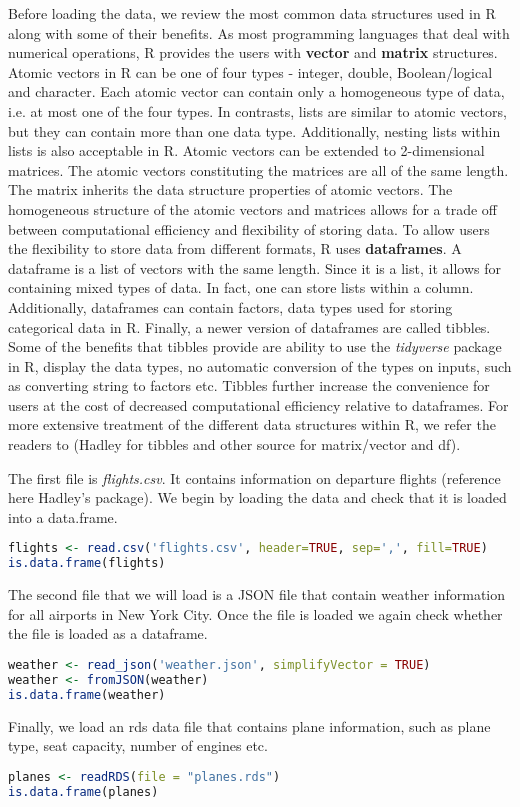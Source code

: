 Before loading the data, we review the most common data structures used in R along with some of their benefits.
 As most programming languages that deal with numerical operations, R provides the users with \textbf{vector} and \textbf{matrix} structures.
 Atomic vectors in R can be one of four types - integer, double, Boolean/logical and character.
 Each atomic vector can contain only a homogeneous type of data, i.e. at most one of the four types.
 In contrasts, lists are similar to atomic vectors, but they can contain more than one data type.
 Additionally, nesting lists within lists is also acceptable in R.
 Atomic vectors can be extended to 2-dimensional matrices.
 The atomic vectors constituting the matrices are all of the same length.
 The matrix inherits the data structure properties of atomic vectors.
 The homogeneous structure of the atomic vectors and matrices allows for a trade off between computational efficiency and flexibility of storing data.
 To allow users the flexibility to store data from different formats, R uses \textbf{dataframes}.
 A dataframe is a list of vectors with the same length.
 Since it is a list, it allows for containing mixed types of data.
 In fact, one can store lists within a column.
 Additionally, dataframes can contain factors, data types used for storing categorical data in R.
 Finally, a newer version of dataframes are called tibbles.
 Some of the benefits that tibbles provide are ability to use the \textit{tidyverse} package in R, display the data types, no automatic conversion of the types on inputs, such as converting string to factors etc. Tibbles further increase the convenience for users at the cost of decreased computational efficiency relative to dataframes.
 For more extensive treatment of the different data structures within R, we refer the readers to (Hadley for tibbles and other source for matrix/vector and df).

The first file is \textit{flights.csv}. It contains information on departure flights (reference here Hadley's package). We begin by loading the data and check that it is loaded into a data.frame.
\begin{lstlisting}[language=R]
flights <- read.csv('flights.csv', header=TRUE, sep=',', fill=TRUE)
is.data.frame(flights)
\end{lstlisting}
The second file that we will load is a JSON file that contain weather information for all airports in New York City. Once the file is loaded we again check whether the file is loaded as a dataframe.
\begin{lstlisting}[language=R]
weather <- read_json('weather.json', simplifyVector = TRUE)
weather <- fromJSON(weather)
is.data.frame(weather)
\end{lstlisting}
Finally, we load an rds data file that contains plane information, such as plane type, seat capacity, number of engines etc.
\begin{lstlisting}[language=R]
planes <- readRDS(file = "planes.rds")
is.data.frame(planes)
\end{lstlisting}

